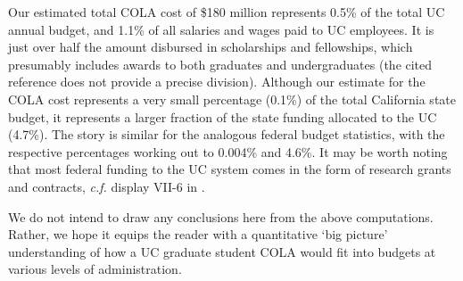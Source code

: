 \documentclass{article}
\begin{document}
Our estimated total COLA cost of \$180 million represents 0.5\% of the total UC annual budget, and 1.1\% of all salaries and wages paid to UC employees. It is just over half the amount disbursed in scholarships and fellowships, which presumably includes awards to both graduates and undergraduates (the cited reference does not provide a precise division). Although our estimate for the COLA cost represents a very small percentage (0.1\%) of the total California state budget, it represents a larger fraction of the state funding allocated to the UC (4.7\%). The story is similar for the analogous federal budget statistics, with the respective percentages working out to 0.004\% and 4.6\%. It may be worth noting that most federal funding to the UC system comes in the form of research grants and contracts, \emph{c.f.} display VII-6 in \cite{ucbudgrep}.

We do not intend to draw any conclusions here from the above computations. Rather, we hope it equips the reader with a quantitative `big picture' understanding of how a UC graduate student COLA would fit into budgets at various levels of administration.
\end{document}
